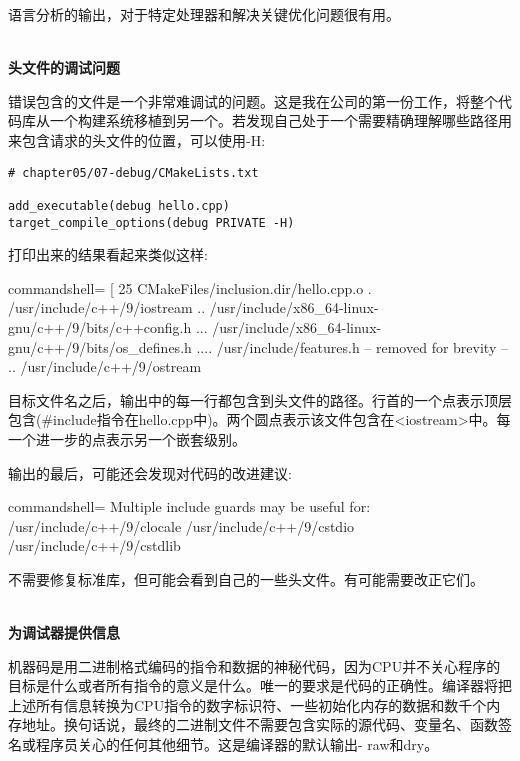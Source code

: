 语言分析的输出，对于特定处理器和解决关键优化问题很有用。

\hspace*{\fill} \\ %
\noindent
\textbf{头文件的调试问题}

错误包含的文件是一个非常难调试的问题。这是我在公司的第一份工作，将整个代码库从一个构建系统移植到另一个。若发现自己处于一个需要精确理解哪些路径用来包含请求的头文件的位置，可以使用-H:

\begin{lstlisting}[style=styleCMake]
# chapter05/07-debug/CMakeLists.txt

add_executable(debug hello.cpp)
target_compile_options(debug PRIVATE -H)
\end{lstlisting}

打印出来的结果看起来类似这样:

\begin{tcblisting}{commandshell={}}
[ 25%
CMakeFiles/inclusion.dir/hello.cpp.o
. /usr/include/c++/9/iostream
.. /usr/include/x86_64-linux-gnu/c++/9/bits/c++config.h
... /usr/include/x86_64-linux-gnu/c++/9/bits/os_defines.h
.... /usr/include/features.h
-- removed for brevity --
.. /usr/include/c++/9/ostream
\end{tcblisting}

目标文件名之后，输出中的每一行都包含到头文件的路径。行首的一个点表示顶层包含(\#include指令在hello.cpp中)。两个圆点表示该文件包含在<iostream>中。每一个进一步的点表示另一个嵌套级别。

输出的最后，可能还会发现对代码的改进建议:

\begin{tcblisting}{commandshell={}}
Multiple include guards may be useful for:
/usr/include/c++/9/clocale
/usr/include/c++/9/cstdio
/usr/include/c++/9/cstdlib
\end{tcblisting}

不需要修复标准库，但可能会看到自己的一些头文件。有可能需要改正它们。

\hspace*{\fill} \\ %
\noindent
\textbf{为调试器提供信息}

机器码是用二进制格式编码的指令和数据的神秘代码，因为CPU并不关心程序的目标是什么或者所有指令的意义是什么。唯一的要求是代码的正确性。编译器将把上述所有信息转换为CPU指令的数字标识符、一些初始化内存的数据和数千个内存地址。换句话说，最终的二进制文件不需要包含实际的源代码、变量名、函数签名或程序员关心的任何其他细节。这是编译器的默认输出- raw和dry。


